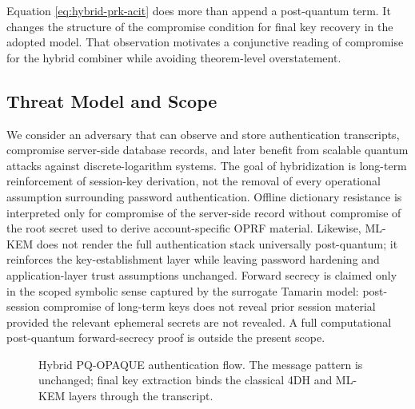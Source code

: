 \documentclass[conference]{IEEEtran}
\newcommand{\Label}[1]{L_{\mathrm{#1}}}
\begin{document}
Equation \eqref{eq:hybrid-prk-acit} does more than append a post-quantum term. It changes the structure of the compromise condition for final key recovery in the adopted model. That observation motivates a conjunctive reading of compromise for the hybrid combiner while avoiding theorem-level overstatement.

\subsection{Threat Model and Scope}

We consider an adversary that can observe and store authentication transcripts, compromise server-side database records, and later benefit from scalable quantum attacks against discrete-logarithm systems. The goal of hybridization is long-term reinforcement of session-key derivation, not the removal of every operational assumption surrounding password authentication. Offline dictionary resistance is interpreted only for compromise of the server-side record without compromise of the root secret used to derive account-specific OPRF material. Likewise, ML-KEM does not render the full authentication stack universally post-quantum; it reinforces the key-establishment layer while leaving password hardening and application-layer trust assumptions unchanged. Forward secrecy is claimed only in the scoped symbolic sense captured by the surrogate Tamarin model: post-session compromise of long-term keys does not reveal prior session material provided the relevant ephemeral secrets are not revealed. A full computational post-quantum forward-secrecy proof is outside the present scope.

\begin{figure}[t]
\centering
{}
\caption{Hybrid PQ-OPAQUE authentication flow. The message pattern is unchanged; final key extraction binds the classical 4DH and ML-KEM layers through the transcript.}
\label{fig:acit-flow}
\end{figure}
\end{document}
